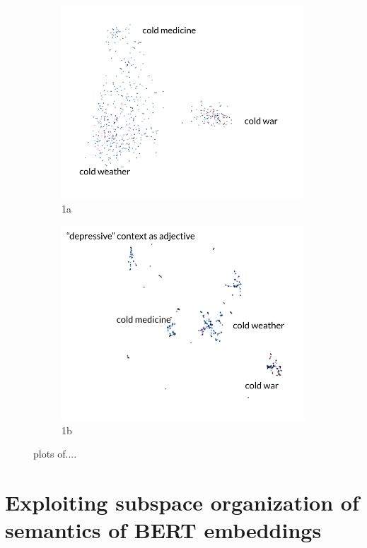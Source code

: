 \documentclass[a4paper,12pt,twoside,openright]{report}
\begin{document}
\begin{figure}
\begin{subfigure}{.5\textwidth}
  \centering
  \includegraphics[width=.8\linewidth]{./assets/analysis/cold_pca.png}
  \caption{1a}
  \label{fig:sfig1}
\end{subfigure}%
\begin{subfigure}{.5\textwidth}
  \centering
  \includegraphics[width=.8\linewidth]{./assets/analysis/cold_umap.png}
  \caption{1b}
  \label{fig:sfig2}
\end{subfigure}
\caption{plots of....}
\label{fig:fig}
\end{figure}


\chapter{Exploiting subspace organization of semantics of BERT embeddings}
\end{document}
